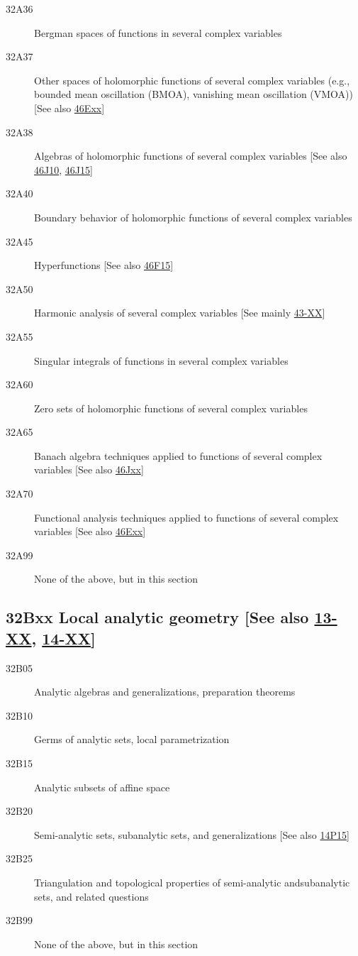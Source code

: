 \documentclass[letterpaper]{article}
\begin{document}
\begin{description}
\item [32A36]\label{32A36} Bergman spaces of functions in several complex variables
\item [32A37]\label{32A37} Other spaces of holomorphic functions of several complex variables (e.g., bounded mean oscillation (BMOA), vanishing mean oscillation (VMOA)) [See also \hyperref[46Exx]{46Exx}]
\item [32A38]\label{32A38} Algebras of holomorphic functions of several complex variables [See also \hyperref[46J10]{46J10}, \hyperref[46J15]{46J15}]
\item [32A40]\label{32A40} Boundary behavior of holomorphic functions of several complex variables
\item [32A45]\label{32A45} Hyperfunctions [See also \hyperref[46F15]{46F15}]
\item [32A50]\label{32A50} Harmonic analysis of several complex variables [See mainly \hyperref[43-XX]{43-XX}]
\item [32A55]\label{32A55} Singular integrals of functions in several complex variables
\item [32A60]\label{32A60} Zero sets of holomorphic functions of several complex variables
\item [32A65]\label{32A65} Banach algebra techniques applied to functions of several complex variables [See also \hyperref[46Jxx]{46Jxx}]
\item [32A70]\label{32A70} Functional analysis techniques applied to functions of several complex variables [See also \hyperref[46Exx]{46Exx}]
\item [32A99]\label{32A99} None of the above, but in this section
\end{description}
\subsection*{32Bxx  Local analytic geometry [See also \hyperref[13-XX]{13-XX}, \hyperref[14-XX]{14-XX}] }\label{32Bxx}
\begin{description}  
\item [32B05]\label{32B05} Analytic algebras and generalizations, preparation theorems
\item [32B10]\label{32B10} Germs of analytic sets, local parametrization
\item [32B15]\label{32B15} Analytic subsets of affine space
\item [32B20]\label{32B20} Semi-analytic sets, subanalytic sets, and generalizations [See also \hyperref[14P15]{14P15}]
\item [32B25]\label{32B25} Triangulation and topological properties of semi-analytic andsubanalytic sets, and related questions
\item [32B99]\label{32B99} None of the above, but in this section
\end{description}
\end{document}
